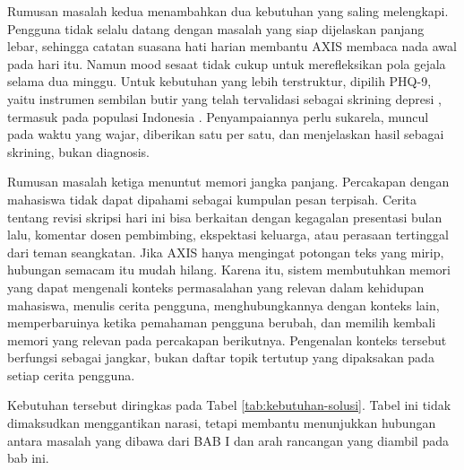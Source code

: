 Rumusan masalah kedua menambahkan dua kebutuhan yang saling melengkapi. Pengguna tidak selalu datang dengan masalah yang siap dijelaskan panjang lebar, sehingga catatan suasana hati harian membantu AXIS membaca nada awal pada hari itu. Namun mood sesaat tidak cukup untuk merefleksikan pola gejala selama dua minggu. Untuk kebutuhan yang lebih terstruktur, dipilih PHQ-9, yaitu instrumen sembilan butir yang telah tervalidasi sebagai skrining depresi \parencite{kroenke2001phq9}, termasuk pada populasi Indonesia \parencite{yulia2022phq9indo}. Penyampaiannya perlu sukarela, muncul pada waktu yang wajar, diberikan satu per satu, dan menjelaskan hasil sebagai skrining, bukan diagnosis.

Rumusan masalah ketiga menuntut memori jangka panjang. Percakapan dengan mahasiswa tidak dapat dipahami sebagai kumpulan pesan terpisah. Cerita tentang revisi skripsi hari ini bisa berkaitan dengan kegagalan presentasi bulan lalu, komentar dosen pembimbing, ekspektasi keluarga, atau perasaan tertinggal dari teman seangkatan. Jika AXIS hanya mengingat potongan teks yang mirip, hubungan semacam itu mudah hilang. Karena itu, sistem membutuhkan memori yang dapat mengenali konteks permasalahan yang relevan dalam kehidupan mahasiswa, menulis cerita pengguna, menghubungkannya dengan konteks lain, memperbaruinya ketika pemahaman pengguna berubah, dan memilih kembali memori yang relevan pada percakapan berikutnya. Pengenalan konteks tersebut berfungsi sebagai jangkar, bukan daftar topik tertutup yang dipaksakan pada setiap cerita pengguna.

Kebutuhan tersebut diringkas pada Tabel \ref{tab:kebutuhan-solusi}. Tabel ini tidak dimaksudkan menggantikan narasi, tetapi membantu menunjukkan hubungan antara masalah yang dibawa dari BAB I dan arah rancangan yang diambil pada bab ini.

